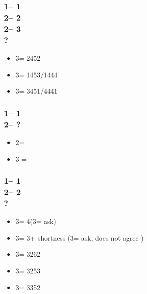 \documentclass[12pt, a4paper]{report}
\begin{document}
{{{            \subsubsection*{1\diams -- 1\hearts\\
                            2\hearts -- 2\spades\\
                            2\nt -- 3\clubs\\
                            ?}
            \begin{itemize}
                \item 3\diams = 2452
                \item 3\hearts = 1453/1444
                \item 3\spades = 3451/4441
            \end{itemize}

            \subsubsection*{1\diams -- 1\spades\\
                            2\spades -- ?}
            \begin{itemize}
                \item 2\nt = \gf
                \item 3 = \inv
            \end{itemize}

            \subsubsection*{1\diams -- 1\spades\\
                            2\spades -- 2\nt\\
                            ?}
            \begin{itemize}
                \item 3\clubs = 4\spades (3\diams = ask)
                \item 3\diams = 3\spades + shortness (3\hearts = ask, does not agree \spades)
                \item 3\hearts = 3262
                \item 3\spades = 3253
                \item 3\nt = 3352
            \end{itemize}

}}}
\end{document}
